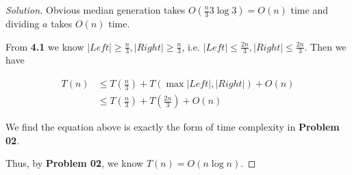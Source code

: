 \documentclass{article}
\newenvironment{solution}{\begin{proof}[\noindent\it Solution]}{\end{proof}}
\begin{document}
\begin{solution}
    \hspace{2.5em}
    Obvious median generation takes $O\left(\frac{n}{3}3\log3\right)=O\left(n\right)$ time and dividing $a$ takes $O(n)$ time.
    
    \hspace{2.5em}
    From \textbf{4.1} we know $|Left|\geq\frac{n}{3}, |Right|\geq\frac{n}{3}$, i.e. $|Left|\le\frac{2n}{3}, |Right|\le\frac{2n}{3}$. Then we have
    
    \vspace{-1.5em}
    \begin{align*}
        T(n) &\le T\left(\frac{n}{3}\right)+T\left(\max{|Left|,|Right|}\right)+O(n) \\
        &\le T\left(\frac{n}{3}\right)+T\left(\frac{2n}{3}\right)+O(n) 
    \end{align*}
    
    \hspace{2.5em}
    We find the equation above is exactly the form of time complexity in \textbf{Problem 02}. 
    
    \hspace{2.5em}
    Thus, by \textbf{Problem 02}, we know $T(n)=O(n\log n)$.
\end{solution}

\vspace{0.5em}
\end{document}
